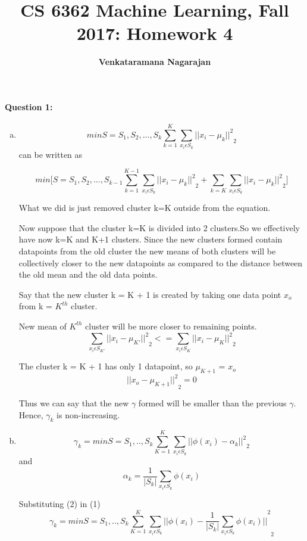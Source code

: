 \documentclass[letterpaper,11pt]{article}
\title{CS 6362 Machine Learning, Fall 2017: Homework 4}
\date{}
\author{\bf Venkataramana Nagarajan}
\begin{document}
\maketitle

\paragraph{Question 1:} 
\begin{enumerate}[(a)]

\item

\[
	min S={S_1,S_2,...,S_k} \sum_{k=1}^{K} \sum_{x_i\epsilon S_k}^{}{{|| x_i - \mu_k||}^2}_2
\]
can be written as 

\[
	min \Bigg[S={S_1,S_2,...,S_{k-1}} \sum_{k=1}^{K-1} \sum_{x_i\epsilon S_k}^{}{{|| x_i - \mu_k||}^2}_2 + \sum_{k=K}\sum_{x_i\epsilon S_k}^{}{{|| x_i - \mu_k||}^2}_2 \Bigg]
\]

What we did is just removed cluster k=K outside from the equation.

Now suppose that the cluster k=K is divided into 2 clusters.So we effectively have now k=K and K+1 clusters.
Since the new clusters formed contain datapoints from the old cluster the new means of both clusters will be collectively closer to the new datapoints as compared to the distance between the old mean and the old data points.

Say that the new cluster k = K + 1 is created by taking one data point $x_o$ from k = $K^{th}$ cluster.

New mean of $K^{th}$ cluster will be more closer to remaining points.
\[
	\sum\limits_{x_i{\epsilon}S_{K'}}{{{||x_i - {\mu}_{K'}||}^2}_2} <= \sum\limits_{x_i{\epsilon}S_K}{{{||x_i - {\mu}_K||}^2}_2}
\] 

The cluster k = K + 1 has only 1 datapoint, so  $\mu_{K+1}$ = $x_o$
\[
	{{||x_o - {\mu}_{K+1}||}^2}_2 = 0
\]


Thus we can say that the new $\gamma$ formed will be smaller than the previous $\gamma$. Hence, $\gamma_k$ is non-increasing.

\item

\[
	{\gamma}_k = min S={S_1,..,S_k}\sum\limits_{K=1}^K\sum\limits_{x_i{\epsilon}S_k} {{||{\phi}(x_i) - {\alpha}_k||}^2}_2 \tag{1}
\]
and 
\[
	{\alpha}_k = \frac{1}{|S_k|}\sum_{x_i{\epsilon}S_k}{\phi}(x_i) \tag{2}
\]

Substituting (2) in (1)
\[
	{\gamma}_k =min S={S_1,..,S_k}\sum\limits_{K=1}^K\sum\limits_{x_i{\epsilon}S_k} {{||{\phi}(x_i) - \frac{1}{|S_k|}\sum_{x_i{\epsilon}S_k}{\phi}(x_i)||}^2}_2  \tag{3}
\]


\end{enumerate}
\end{document}
